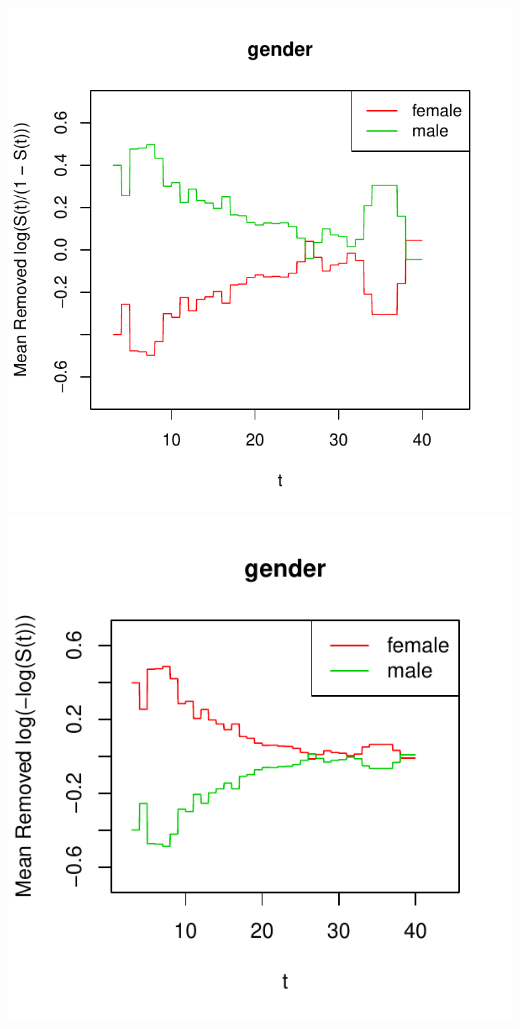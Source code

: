 \documentclass[a4paper]{article}
\begin{document}
\begin{minipage}[t]{.85\linewidth}%
\includegraphics{icenReg-016}
\includegraphics{icenReg-017}
\end{minipage}
\end{document}
